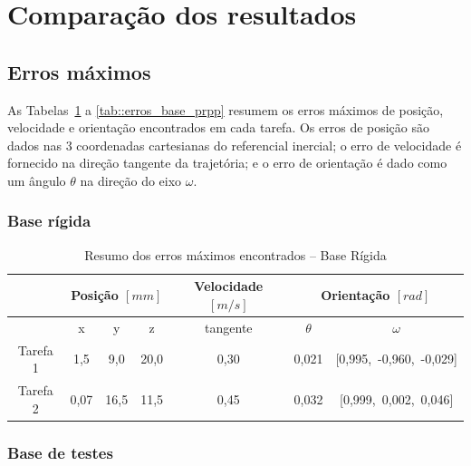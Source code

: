 \section{Comparação dos resultados} \label{sec::comparacao}

\subsection{Erros máximos}

As Tabelas~\ref{tab::erros_base_rig} a \ref{tab::erros_base_prpp} resumem os
erros máximos de posição, velocidade e orientação encontrados em cada tarefa. Os
erros de posição são dados nas 3 coordenadas cartesianas do referencial
inercial; o erro de velocidade é fornecido na direção tangente da trajetória; e
o erro de orientação é dado como um ângulo $\theta$ na direção do eixo $\omega$.

\subsubsection{Base rígida}

\begin{table}[h!]
\centering
\caption{Resumo dos erros máximos encontrados -- Base Rígida}
\label{tab::erros_base_rig}
\begin{tabular}{@{}ccccccc@{}}
\toprule
         & \multicolumn{3}{c}{\textbf{Posição $[mm]$}} & \textbf{Velocidade $[m/s]$} & \multicolumn{2}{c}{\textbf{Orientação $[rad]$}} 	\\ \midrule
         & x          & y          & z          & tangente            & $\theta$            & $\omega$         		\\
Tarefa 1 & 1,5        & 9,0        & 20,0       & 0,30                &	0,021				& [0,995,~-0,960,~-0,029]                  	\\
Tarefa 2 & 0,07       & 16,5	   & 11,5       & 0,45                & 0,032				& [0,999,~0,002,~0,046] \\ \bottomrule
\end{tabular}
\end{table}


\subsubsection{Base de testes}

